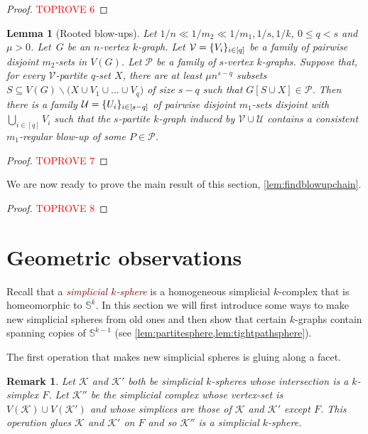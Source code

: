 \documentclass[12pt,reqno]{amsart}
\theoremstyle{plain}
\newtheorem{lemma}[theorem]{Lemma}
\newtheorem{remark}[theorem]{Remark}
\theoremstyle{definition}
\numberwithin{equation}{section}
\DeclarePairedDelimiter{\set}{\{}{\}}
\renewcommand{\leq}{\leqslant}
\renewcommand{\setminus}{\smallsetminus}
\newcommand{\defn}[1]{\textcolor{Maroon}{\emph{#1}}}
\newcommand{\bS}{\mathbb{S}}
\newcommand{\cK}{\mathcal{K}}
\newcommand{\cP}{\mathcal{P}}
\newcommand{\cU}{\mathcal{U}}
\newcommand{\cV}{\mathcal{V}}
\begin{document}
	\begin{proof}\textcolor{red}{TOPROVE 6}\end{proof}
	
	\begin{lemma}[Rooted blow-ups]\label{lem:rooted-blow-ups}
		Let $1/n \ll 1/m_2 \ll 1/m_1, 1/s,1/k$, $0 \leq q < s$ and $\mu>0$.
		Let~$G$ be an $n$-vertex $k$-graph.
		Let $\cV = \set{V_i}_{i \in [q]}$ be a family of pairwise disjoint $m_2$-sets in $V(G)$.
		Let $\cP$ be a family of $s$-vertex $k$-graphs.
		Suppose that, for every $\cV$-partite $q$-set $X$, there are at least $\mu n^{s - q}$ subsets $S \subseteq V(G) \setminus \big(X \cup V_1 \cup \dots \cup V_q\big)$ of size $s - q$ such that $G[S \cup X] \in \cP$.
		Then there is a family $\cU = \set{U_i}_{i \in [s - q]}$ of pairwise disjoint $m_1$-sets disjoint with $\bigcup_{i\in[q]} V_i$ such that the $s$-partite $k$-graph induced by $\cV \cup \cU$ contains a consistent $m_1$-regular blow-up of some $P\in \cP$.
	\end{lemma}
	
	\begin{proof}\textcolor{red}{TOPROVE 7}\end{proof}
	
	
	We are now ready to prove the main result of this section, \cref{lem:findblowupchain}.
	
	\begin{proof}\textcolor{red}{TOPROVE 8}\end{proof}
	
	
	\section{Geometric observations}
	\label{sec:geometric_obs}
	
	Recall that a \defn{simplicial $k$-sphere} is a homogeneous simplicial $k$-complex that is homeomorphic to $\bS^k$. In this section we will first introduce some ways to make new simplicial spheres from old ones and then show that certain $k$-graphs contain spanning copies of $\bS^{k - 1}$ (see \cref{lem:partitesphere,lem:tightpathsphere}).
	
	The first operation that makes new simplicial spheres is gluing along a facet.
	
	\begin{remark}\label{rmk:gluecommonface}
		Let $\cK$ and $\cK'$ both be simplicial $k$-spheres whose intersection is a $k$-simplex $F$. Let $\cK''$ be the simplicial complex whose vertex-set is $V(\cK) \cup V(\cK')$ and whose simplices are those of $\cK$ and $\cK'$ except $F$. This operation glues $\cK$ and $\cK'$ on $F$ and so $\cK''$ is a simplicial $k$-sphere.
	\end{remark}
	
\end{document}
